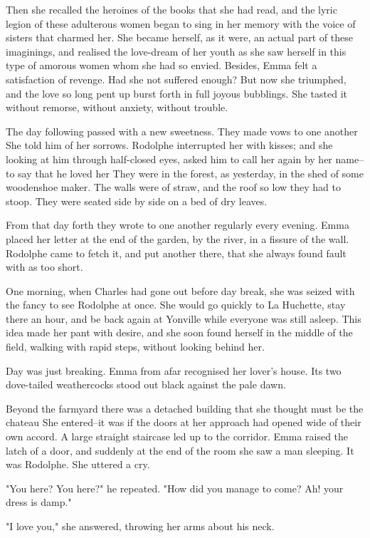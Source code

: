 \documentclass{tufte-book}
\begin{document}
Then she recalled the heroines of the books that she had read, and the
lyric legion of these adulterous women began to sing in her memory with
the voice of sisters that charmed her. She became herself, as it were,
an actual part of these imaginings, and realised the love-dream of her
youth as she saw herself in this type of amorous women whom she had
so envied. Besides, Emma felt a satisfaction of revenge. Had she not
suffered enough? But now she triumphed, and the love so long pent up
burst forth in full joyous bubblings. She tasted it without remorse,
without anxiety, without trouble.

The day following passed with a new sweetness. They made vows to one
another She told him of her sorrows. Rodolphe interrupted her with
kisses; and she looking at him through half-closed eyes, asked him to
call her again by her name--to say that he loved her They were in the
forest, as yesterday, in the shed of some woodenshoe maker. The walls
were of straw, and the roof so low they had to stoop. They were seated
side by side on a bed of dry leaves.

From that day forth they wrote to one another regularly every evening.
Emma placed her letter at the end of the garden, by the river, in a
fissure of the wall. Rodolphe came to fetch it, and put another there,
that she always found fault with as too short.

One morning, when Charles had gone out before day break, she was seized
with the fancy to see Rodolphe at once. She would go quickly to La
Huchette, stay there an hour, and be back again at Yonville while
everyone was still asleep. This idea made her pant with desire, and she
soon found herself in the middle of the field, walking with rapid steps,
without looking behind her.

Day was just breaking. Emma from afar recognised her lover's house. Its
two dove-tailed weathercocks stood out black against the pale dawn.

Beyond the farmyard there was a detached building that she thought must
be the chateau She entered--it was if the doors at her approach had
opened wide of their own accord. A large straight staircase led up to
the corridor. Emma raised the latch of a door, and suddenly at the end
of the room she saw a man sleeping. It was Rodolphe. She uttered a cry.

"You here? You here?" he repeated. "How did you manage to come? Ah! your
dress is damp."

"I love you," she answered, throwing her arms about his neck.
\end{document}

